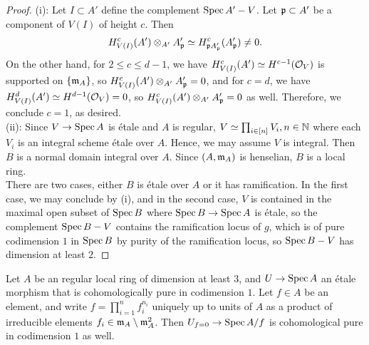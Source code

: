 \begin{proof}
(i): Let $I \subset A'$ define the complement $\spec{A'} - V$. Let $\ideal{p} \subset A'$ be a component of $V(I)$ of height $c$. Then 
\[H_{V(I)}^c(A') \otimes_{A'} A'_{\ideal{p}} \simeq H_{\ideal{p}A'_{\ideal{p}}}^c(A'_{\ideal{p}}) \neq 0.\]
On the other hand, for $2 \le c \le d-1$, we have $H_{V(I)}^c(A') \simeq H^{c-1}(\cal{O}_V)$ is supported on $\{\ideal{m}_{A}\}$, so $H_{V(I)}^c(A') \otimes_{A'} A'_{\ideal{p}} = 0$,
and for $c=d$, we have $H_{V(I)}^d(A') \simeq H^{d-1}(\cal{O}_V) = 0$, so $H_{V(I)}^c(A') \otimes_{A'} A'_{\ideal{p}} = 0$ as well.
Therefore, we conclude $c=1$, as desired.\\
(ii): Since $V \to \spec{A}$ is \'{e}tale and $A$ is regular, $V \simeq \prod_{i \in [n]} V_i, n \in \bb{N}$ where each $V_i$ is an integral scheme \'{e}tale over $A$. 
Hence, we may assume $V$ is integral.
Then $B$ is a normal domain integral over $A$. Since
$(A,\ideal{m}_A)$ is henselian, $B$ is a local ring.\\
\indent There are two cases, either $B$ is \'{e}tale over $A$ or it has ramification. In the first case, 
we may conclude by (i),
and in the second case, $V$ is contained in the maximal open subset of $\spec{B}$ where $\spec{B} \to \spec{A}$ is \'{e}tale, 
so the complement $\spec{B} - V$ contains the ramification locus of $g$, which is of pure codimension $1$ in $\spec{B}$ by purity of the ramification locus, 
so $\spec{B} - V$ has dimension at least $2$.
\end{proof}
\begin{theorem}\label{thm:topinput}
Let $A$ be an regular local ring of dimension at least $3$, and $U \to \spec{A}$ an \'{e}tale morphism that is cohomologically pure in codimension $1$.
Let $f \in A$ be an element, and write $f = \prod_{i=1}^n f_i^{n_i}$ uniquely up to units of $A$ as a product of irreducible elements $f_i \in \ideal{m}_A \setminus \ideal{m}_A^2$.
Then $U_{f=0} \to \spec{A/f}$ is cohomological pure in codimension $1$ as well.
\end{theorem}
